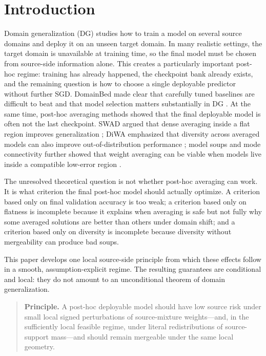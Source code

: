 \documentclass[11pt]{article}
\newcommand{\1}{\mathbf{1}}
\theoremstyle{plain}
\theoremstyle{definition}
\theoremstyle{remark}
\begin{document}
\section{Introduction}
Domain generalization (DG) studies how to train a model on several source domains and deploy it on an unseen target domain. In many realistic settings, the target domain is unavailable at training time, so the final model must be chosen from source-side information alone. This creates a particularly important post-hoc regime: training has already happened, the checkpoint bank already exists, and the remaining question is how to choose a single deployable predictor without further SGD. DomainBed made clear that carefully tuned baselines are difficult to beat and that model selection matters substantially in DG \cite{gulrajani2021domainbed}. At the same time, post-hoc averaging methods showed that the final deployable model is often not the last checkpoint. SWAD argued that dense averaging inside a flat region improves generalization \cite{cha2021swad}; DiWA emphasized that diversity across averaged models can also improve out-of-distribution performance \cite{rame2022diwa}; model soups and mode connectivity further showed that weight averaging can be viable when models live inside a compatible low-error region \cite{wortsman2022soups,garipov2018connectivity,frankle2020connectivity}.

The unresolved theoretical question is not whether post-hoc averaging can work. It is what criterion the final post-hoc model should actually optimize. A criterion based only on final validation accuracy is too weak; a criterion based only on flatness is incomplete because it explains when averaging is safe but not fully why some averaged solutions are better than others under domain shift; and a criterion based only on diversity is incomplete because diversity without mergeability can produce bad soups.

This paper develops one local source-side principle from which these effects follow in a smooth, assumption-explicit regime. The resulting guarantees are conditional and local: they do not amount to an unconditional theorem of domain generalization.

\begin{quote}
\textbf{Principle.} A post-hoc deployable model should have low source risk under small local signed perturbations of source-mixture weights---and, in the sufficiently local feasible regime, under literal redistributions of source-support mass---and should remain mergeable under the same local geometry.
\end{quote}
\end{document}
